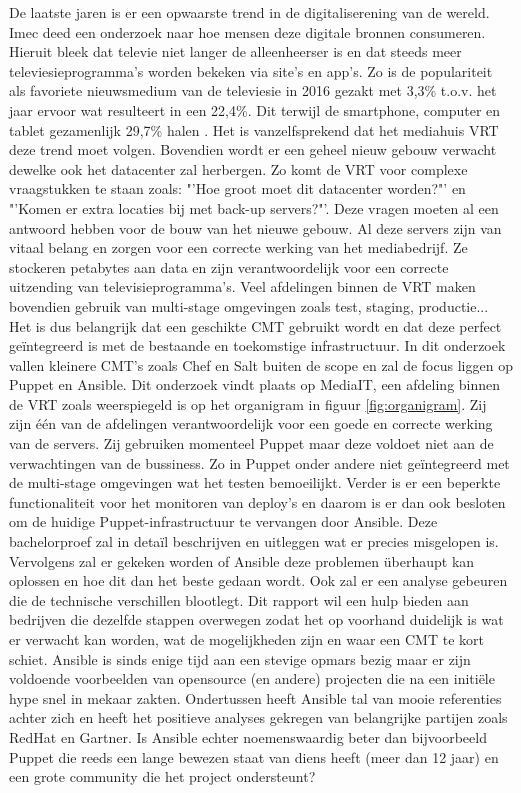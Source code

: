 De laatste jaren is er een opwaarste trend in de digitaliserening van de wereld. Imec deed een onderzoek naar hoe mensen deze digitale bronnen consumeren. Hieruit bleek dat televie niet langer de alleenheerser is en dat steeds meer televiesieprogramma's worden bekeken via site's en app's. Zo is de populariteit als favoriete nieuwsmedium van de televiesie in 2016 gezakt met 3,3\% t.o.v. het jaar ervoor wat resulteert in een 22,4\%. Dit terwijl de smartphone, computer en tablet gezamenlijk 29,7\% halen \autocite{digimeter}. Het is vanzelfsprekend dat het mediahuis VRT deze trend moet volgen.
Bovendien wordt er een geheel nieuw gebouw verwacht dewelke ook het datacenter zal herbergen. Zo komt de VRT voor complexe vraagstukken te staan zoals: "'Hoe groot moet dit datacenter worden?"'  en "'Komen er extra locaties bij met back-up servers?"'.  Deze vragen moeten al een antwoord hebben voor de bouw van het nieuwe gebouw. \newline
Al deze servers zijn van vitaal belang en zorgen voor een correcte werking van het mediabedrijf. Ze stockeren petabytes aan data en zijn verantwoordelijk voor een correcte uitzending van televisieprogramma's. Veel afdelingen binnen de VRT maken bovendien gebruik van multi-stage omgevingen zoals test, staging, productie... Het is dus belangrijk dat een geschikte CMT gebruikt wordt en dat deze perfect ge\"integreerd is met de bestaande en toekomstige infrastructuur.
In dit onderzoek vallen kleinere CMT's zoals Chef en Salt buiten de scope en zal de focus liggen op Puppet en Ansible. Dit onderzoek vindt plaats op MediaIT, een afdeling binnen de VRT zoals weerspiegeld is op het organigram in figuur \ref{fig:organigram}. Zij zijn \'e\'en van de afdelingen verantwoordelijk voor een goede en correcte werking van de servers. Zij gebruiken momenteel Puppet maar deze voldoet niet aan de verwachtingen van de bussiness. Zo in Puppet onder andere niet ge\"integreerd met de multi-stage omgevingen wat het testen bemoeilijkt. Verder is er een beperkte functionaliteit voor het monitoren van deploy's en daarom is er dan ook besloten om de huidige Puppet-infrastructuur te vervangen door Ansible.
\newline
Deze bachelorproef zal in deta\"il beschrijven en uitleggen wat er precies misgelopen is. Vervolgens zal er gekeken worden of Ansible deze problemen \"uberhaupt kan oplossen en hoe dit dan het beste gedaan wordt. Ook zal er een analyse gebeuren die de technische verschillen blootlegt.  Dit rapport wil een hulp bieden aan bedrijven die dezelfde stappen overwegen zodat het op voorhand duidelijk is wat er verwacht kan worden, wat de mogelijkheden zijn en waar een CMT te kort schiet. Ansible is sinds enige tijd aan een stevige opmars bezig maar er zijn voldoende voorbeelden van opensource (en andere) projecten die na een initi\"ele hype snel in mekaar zakten. Ondertussen heeft Ansible tal van mooie referenties achter zich en heeft het positieve analyses gekregen van belangrijke partijen zoals RedHat en Gartner. Is Ansible echter noemenswaardig beter dan bijvoorbeeld Puppet die reeds een lange bewezen staat van diens heeft (meer dan 12 jaar) en een grote community die het project ondersteunt?

